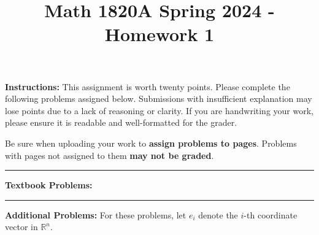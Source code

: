 \documentclass[12pt]{article}
\title{Math 1820A Spring 2024 - Homework 1}
\author{}
\date{}
\newcommand{\R}{\mathbb{R}}
\begin{document}
\maketitle
\vspace{-0.5in}

\textbf{Instructions:}  This assignment is worth twenty points.  Please complete the following problems assigned below.  Submissions with insufficient explanation may lose points due to a lack of reasoning or clarity.  If you are handwriting your work, please ensure it is readable and well-formatted for the grader.

Be sure when uploading your work to \textbf{assign problems to pages}.  Problems with pages not assigned to them \textbf{may not be graded}.

\noindent\rule{\textwidth}{1pt}

\textbf{Textbook Problems: }

\noindent\rule{\textwidth}{1pt}

\textbf{Additional Problems:} For these problems, let $e_{i}$ denote the $i$-th coordinate vector in $\R^{n}$. 
\end{document}
